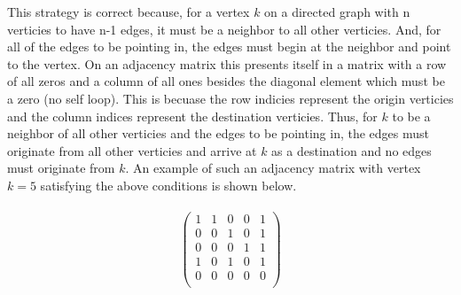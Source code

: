 \documentclass[12pt]{article}
\begin{document}
\begin{enumerate}
{This strategy is correct because, for a vertex $k$ on a directed graph with n verticies to have n-1 edges, it must be a neighbor to all other verticies. 
And, for all of the edges to be pointing in, the edges must begin at the neighbor and point to the vertex. On an adjacency matrix this presents itself in a matrix with 
a row of all zeros and a column of all ones besides the diagonal element which must be a zero (no self loop). This is becuase the row indicies represent the origin verticies
and the column indices represent the destination verticies. Thus, for $k$ to be a neighbor of all other verticies and the edges to be pointing in, the edges must
originate from all other verticies and arrive at $k$ as a destination and no edges must originate from $k$. An example of such an adjacency matrix with vertex $k=5$ 
satisfying the above conditions is shown below. \\\\  

$$
\begin{pmatrix}
1 & 1 & 0 & 0 & 1\\
0 & 0 & 1 & 0 & 1\\
0 & 0 & 0 & 1 & 1\\
1 & 0 & 1 & 0 & 1\\
0 & 0 & 0 & 0 & 0\\
\end{pmatrix}
$$



}



\end{enumerate} 
\end{document}
